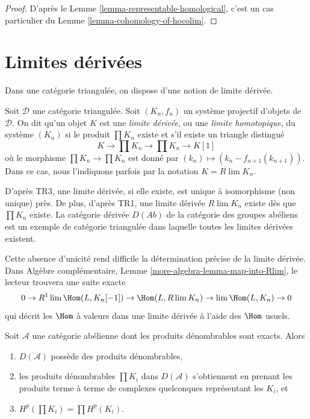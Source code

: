 \begin{proof}
D'après le Lemme \ref{lemma-representable-homological}, c'est un cas
particulier du Lemme \ref{lemma-cohomology-of-hocolim}.
\end{proof}

\section{Limites dérivées}
\label{section-derived-limit}

\noindent
Dans une catégorie triangulée, on dispose d'une notion de limite dérivée.

\begin{definition}
\label{definition-derived-limit}
Soit $\mathcal{D}$ une catégorie triangulée.
Soit $(K_n, f_n)$ un système projectif d'objets de $\mathcal{D}$.
On dit qu'un objet $K$ est une {\it limite dérivée}, ou une
{\it limite homotopique}, du système $(K_n)$ si le produit $\prod K_n$ existe
et s'il existe un triangle distingué
$$
K \to \prod K_n \to \prod K_n \to K[1]
$$
où le morphisme $\prod K_n \to \prod K_n$ est donné par
$(k_n) \mapsto (k_n - f_{n + 1}(k_{n + 1}))$. Dans ce cas, nous l'indiquons
parfois par la notation $K = R\lim K_n$.
\end{definition}

\noindent
D'après TR3, une limite dérivée, si elle existe, est unique à isomorphisme
(non unique) près. De plus, d'après TR1, une limite dérivée $R\lim K_n$ existe
dès que $\prod K_n$ existe. La catégorie dérivée $D(\textit{Ab})$ de la
catégorie des groupes abéliens est un exemple de catégorie triangulée dans
laquelle toutes les limites dérivées existent.

\medskip\noindent
Cette absence d'unicité rend difficile la détermination précise de la limite
dérivée. Dans Algèbre complémentaire, Lemme
\ref{more-algebra-lemma-map-into-Rlim}, le lecteur trouvera une suite exacte
$$
0 \to R^1\lim \Hom(L, K_n[-1]) \to \Hom(L, R\lim K_n)
\to \lim \Hom(L, K_n) \to 0
$$
qui décrit les $\Hom$ à valeurs dans une limite dérivée à l'aide des $\Hom$
usuels.

\begin{lemma}
\label{lemma-products}
Soit $\mathcal{A}$ une catégorie abélienne dont les produits dénombrables sont
exacts. Alors
\begin{enumerate}
\item $D(\mathcal{A})$ possède des produits dénombrables,
\item les produits dénombrables $\prod K_i$ dans $D(\mathcal{A})$ s'obtiennent
en prenant les produits terme à terme de complexes quelconques représentant
les $K_i$, et
\item $H^p(\prod K_i) = \prod H^p(K_i)$.
\end{enumerate}
\end{lemma}

